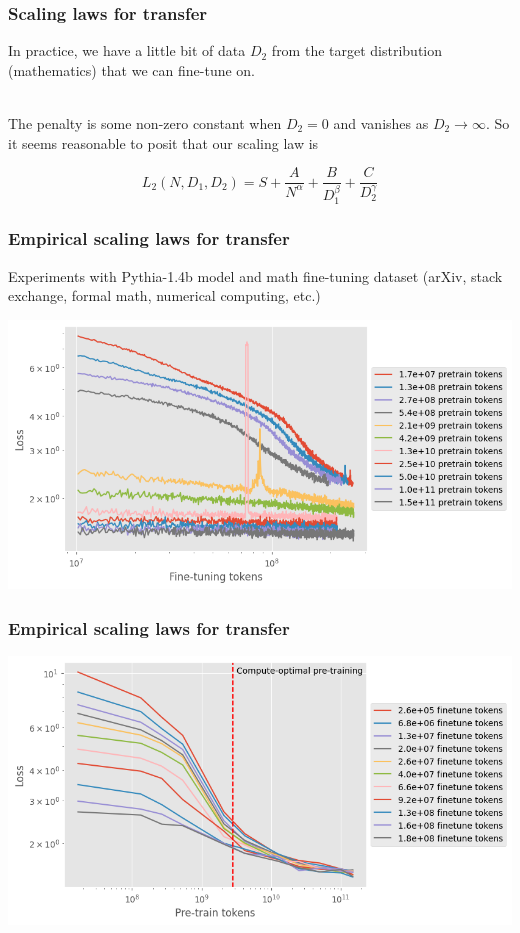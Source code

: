 \documentclass{beamer}
\begin{document}
\begin{frame}
\frametitle{Scaling laws for transfer}
In practice, we have a little bit of data $D_2$ from the target distribution (mathematics) that we can fine-tune on. \\~\

The penalty is some non-zero constant when $D_2=0$ and vanishes as $D_2\to\infty$. So it seems reasonable to posit that our scaling law is 

$$L_2(N, D_1, D_2) = S + \frac{A}{N^\alpha} + \frac{B}{D_1^\beta} + \frac{C}{D_2^\gamma}$$
\end{frame}

\begin{frame}
\frametitle{Empirical scaling laws for transfer}
Experiments with Pythia-1.4b model and math fine-tuning dataset (arXiv, stack exchange, formal math, numerical computing, etc.)
\begin{center}
    \includegraphics[width=1\textwidth]{img/ex1.png}
\end{center}
\end{frame}
\begin{frame}
\frametitle{Empirical scaling laws for transfer}
\begin{center}
    \includegraphics[width=1\textwidth]{img/ex2.png}
\end{center}
\end{frame}
\end{document}
